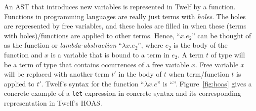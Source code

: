 An AST that introduces new variables is represented in
Twelf by a function.
Functions in programming languages are really just terms
with \emph{holes}.
The holes are represented by free variables,
and these holes are filled in when these
(terms with holes)/functions are applied to other terms.
Hence, ``$x.e_2$'' can be thought of as the function
or \emph{lambda-abstraction} ``$\lambda x.e_2$'',
where $e_2$ is the body of the function and $x$ is a variable
that is bound to a term in $e_2$.
A term $t$ of type  will be a term of type
 that contains occurrences of a free variable $x$.
Free variable $x$ will be replaced with another term $t'$ in
the body of $t$ when term/function $t$ is applied to $t'$.
Twelf's syntax for the function ``$\lambda x.e$'' is
``''.
Figure~\ref{fig:hoas} gives a concrete example of a
\texttt{let} expression in
concrete syntax and its corresponding representation
in Twelf's HOAS.



